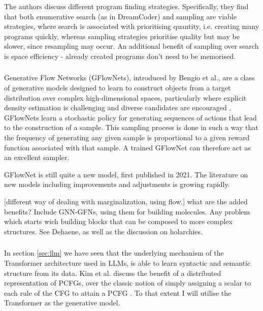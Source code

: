 The authors discuss different program finding strategies. Specifically, they find that both enumerative search (as in DreamCoder) and sampling are viable strategies, where search is associated with prioritising quantity, i.e.  creating many programs quickly, whereas sampling strategies prioritise quality but may be slower, since resampling may occur. An additional benefit of sampling over search is space efficiency - already created programs don't need to be memorised.


\subsubsection{}
Generative Flow Networks (GFlowNets), introduced by Bengio et al., are a class of generative models designed to learn to construct objects from a target distribution over complex high-dimensional spaces, particularly where explicit density estimation is challenging and diverse candidates are encouraged \cite{bengio_flow_2021}. GFlowNets learn a stochastic policy for generating sequences of actions that lead to the construction of a sample. This sampling process is done in such a way that the frequency of generating any given sample is proportional to a given reward function associated with that sample. A trained GFlowNet can therefore act as an excellent sampler.

GFlowNet is still quite a new model, first published in 2021. The literature on new models including improvements and adjustments is growing rapidly.

[different way of dealing with marginalization, using flow.]
what are the added benefits?
Include GNN-GFNs, using them for building molecules. 
Any problem which starts wich building blocks that can be composed to more complex structures. See Dehaene, as well as the discussion on holarchies. 

\subsubsection{}
In section \ref{sec:llm} we have seen that the underlying mechanism of the Transformer architecture used in LLMs, is able to learn syntactic and semantic structure from its data.
Kim et al. discuss the benefit of a distributed representation of PCFGs, over the classic notion of simply assigning a scalar to each rule of the CFG to attain a PCFG  \cite{kim_compound_2019}. To that extent I will utilise the Transformer as the generative model.



